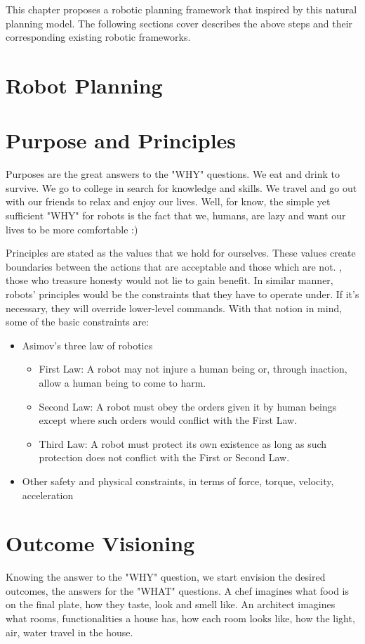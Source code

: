 This chapter proposes a robotic planning framework that inspired by this natural planning model. The following sections cover describes the above steps and their corresponding existing robotic frameworks.

\section{Robot Planning}
\todo{}

\section{Purpose and Principles}
Purposes are the great answers to the "WHY" questions. We eat and drink to survive. We go to college in search for knowledge and skills. We travel and go out with our friends to relax and enjoy our lives. Well, for know, the simple yet sufficient "WHY" for robots is the fact that we, humans, are lazy and want our lives to be more comfortable :)

Principles are stated as the values that we hold for ourselves. These values create boundaries between the actions that are acceptable and those which are not. \Eg, those who treasure honesty would not lie to gain benefit. In similar manner, robots' principles would be the constraints that they have to operate under. If it's necessary, they will override lower-level commands. With that notion in mind, some of the basic constraints are:
\begin{itemize}
	\item Asimov's three law of robotics \cite{asimov2004robot}
	\begin{itemize}
		\item First Law: A robot may not injure a human being or, through inaction, allow a human being to come to harm.
		\item Second Law: A robot must obey the orders given it by human beings except where such orders would conflict with the First Law.
		\item Third Law: A robot must protect its own existence as long as such protection does not conflict with the First or Second Law.
	\end{itemize}
	\item Other safety and physical constraints, in terms of force, torque, velocity, acceleration
\end{itemize}

\section{Outcome Visioning}
Knowing the answer to the "WHY" question, we start envision the desired outcomes, the answers for the "WHAT" questions. A chef imagines what food is on the final plate, how they taste, look and smell like. An architect imagines what rooms, functionalities a house has, how each room looks like, how the light, air, water travel in the house.


